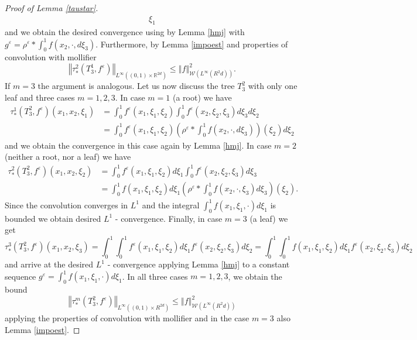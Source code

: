 \documentclass[10pt,a4paper]{amsart}
\newcommand{\R}{\mathbb{R}}
\newcommand{\W}{\mathcal{W}}
\newcommand{\izj}{\int_{0}^{1}}
\newcommand*{\norm}[1]{\left\Vert{#1}\right\Vert}
\newcommand{\ve}{\varepsilon}
\begin{document}
\begin{proof}[Proof of Lemma \ref{taustar}]
\begin{align*}
\xi_1
\end{align*}
and we obtain the desired convergence using by Lemma \ref{hmj} with $g^{\ve}=\rho^{\ve}* \izj f(x_2,\cdot,d\xi_3)$. Furthermore, by Lemma \ref{impoest} and properties of convolution with mollifier 
\[
\norm{\tau^2_{*}(T^1_3,f^{\ve})}_{L^{\infty}((0,1)\times \R^{2d})} \leq \norm{f}^2_{\W(L^{\infty}(R^2d))}.
\]
If $m=3$ the argument is analogous.
Let us now discuss the tree $T^2_3$ with only one leaf  and three cases $m=1,2,3$. In case $m=1$ (a root) we have
\begin{align*}
\tau^1_{*}(T_3^2,f^{\ve})(x_1,x_2,\xi_1) &=  \izj f^\ve(x_1,\xi_1,\xi_2) \izj f^{\ve}(x_2,\xi_2,\xi_3)d\xi_3 d\xi_2
\\
&= \izj f^\ve(x_1,\xi_1,\xi_2)\left(\rho^{\ve}* \izj f(x_2,\cdot,d\xi_3)\right)(\xi_2)d
\xi_2
\end{align*}
and we obtain the convergence in this case again by Lemma \ref{hmj}.
In case $m=2$ (neither a root, nor a leaf) we have
\begin{align*}
\tau^2_{*}(T_3^2,f^{\ve})(x_1,x_2,\xi_2) &=  \izj f^\ve(x_1,\xi_1,\xi_2) d\xi_1 \izj f^{\ve}(x_2,\xi_2,\xi_3)d\xi_3 \\
&=\izj f(x_1,\xi_1,\xi_2) d\xi_1 \left(\rho^{\ve} *\izj f(x_2,\cdot,\xi_3)d\xi_3\right)(\xi_2).
\end{align*}
Since the convolution converges in $L^1$ and the integral $\izj f(x_1,\xi_1,\cdot) d\xi_1$ is bounded we obtain desired $L^1$ - convergence.
Finally, in case $m=3$ (a leaf) we get
\[
\tau^3_{*}(T_3^2,f^{\ve})(x_1,x_2,\xi_3) =  \izj\izj f^\ve(x_1,\xi_1,\xi_2) d\xi_1  f^{\ve}(x_2,\xi_2,\xi_3)d\xi_2 =\izj \izj f(x_1,\xi_1,\xi_2) d\xi_1 f^{\ve}(x_2,\xi_2,\xi_3)d\xi_2 
\]
and arrive at the desired $L^1$ - convergence applying Lemma \ref{hmj} to a constant sequence $g^\ve = \izj f(x_1,\xi_1,\cdot) d\xi_1$.
In all three cases $m=1,2,3$, we obtain the bound 
\[
\norm{\tau^m_{*}(T^2_3,f^{\ve})}_{L^{\infty}((0,1)\times R^{2d})} \leq \norm{f}^2_{\W(L^{\infty}(R^2d))}
\]
applying the properties of convolution with mollifier and in the case $m=3$ also Lemma \ref{impoest}.


\end{proof}
\end{document}
